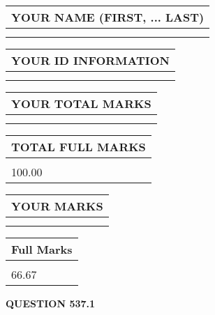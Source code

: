 \documentclass{ctexart}
\begin{document}
   
   
   
\newpage 
\setcounter{page}{ 
   537001 } 
   
   
   
   
\noindent\begin{tabular}{|l|}
\hline
YOUR NAME (FIRST, ... LAST)  \\
\hline
 \\ 
 \\ 
\hline
\end{tabular}
\hspace{0.05in} \begin{tabular}{|l|}
\hline
 YOUR   ID   INFORMATION  \\
\hline
 \\ 
 \\ 
\hline
\end{tabular}
   
   
\vspace{0.2in}\noindent\begin{tabular}{|l|}
\hline
YOUR TOTAL MARKS  \\
\hline
 \\ 
 \\ 
\hline
\end{tabular}
\hspace{0.05in} \begin{tabular}{|l|}
\hline
TOTAL FULL MARKS  \\
\hline
 \\ 
100.00 \\
\hline
\end{tabular}
   
   
 \vspace{0.2in}
 
 
 
 
   
   
  
\vspace{0.2in}
  
\noindent\begin{tabular}{|l|}
\hline
 YOUR MARKS  \\
\hline
 \\ 
 \\ 
\hline
\end{tabular}
\hspace{0.05in} \begin{tabular}{|l|}
\hline
 Full Marks  \\
\hline
 \\ 
66.67 \\
\hline
\end{tabular}
{\textbf{\Large{QUESTION
537.1 
}}}
  
\end{document}
